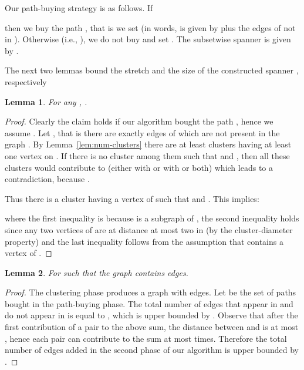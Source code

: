 \documentclass[a4paper,11pt]{article}
\newtheorem{lemma}{Lemma}[section]
\theoremstyle{definition}
\begin{document}
Our path-buying strategy is as follows. If 
 
then we buy the path , that is we set  
(in words,  is given by  plus the edges of  not in ).
Otherwise (i.e., ), we do not buy 
and set .
The subsetwise spanner is given by .












The next two lemmas bound the stretch and the size of the constructed spanner , respectively

\begin{lemma}
\label{lem:s-1}
For any ,  .
\end{lemma}

\begin{proof}
Clearly the claim holds if our algorithm bought the path ,
hence we assume .
Let , that is there are exactly 
edges of  which are not present in the graph .
By Lemma~\ref{lem:num-clusters} there are at least  clusters having
at least one vertex on .
If there is no cluster  among them such that 
 and
,
then all these clusters would contribute to  (either with  or with  or both)
which leads to a contradiction, because .


Thus there is a cluster  having a vertex of  such that 
 and
. This implies:

where the first inequality is because  is a subgraph 
of ,
the second inequality holds since any two vertices of  are at distance at most two in  (by the cluster-diameter property)
and the last inequality follows from the assumption that  contains a vertex of .
\end{proof}

\begin{lemma}
\label{lem:s-2}
For  such that  
the graph  contains  edges.
\end{lemma}

\begin{proof}
The clustering phase produces a graph with  edges.
Let  be the set of paths bought in the path-buying phase.
The total number of edges that appear in  and do not appear in 
is equal to , which is 
upper bounded by .
Observe that after the first contribution of a pair 
to the above sum, the distance between  and  is at most ,
hence each pair  can contribute to the sum at most  times.
Therefore the total number of edges added in the second phase of our algorithm
is upper bounded by .
\end{proof}
\end{document}
